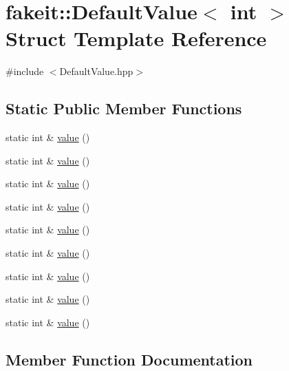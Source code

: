 \hypertarget{structfakeit_1_1DefaultValue_3_01int_01_4}{}\section{fakeit\+::Default\+Value$<$ int $>$ Struct Template Reference}
\label{structfakeit_1_1DefaultValue_3_01int_01_4}


{\ttfamily \#include $<$Default\+Value.\+hpp$>$}

\subsection*{Static Public Member Functions}
\begin{DoxyCompactItemize}
\item 
static int \& \mbox{\hyperlink{structfakeit_1_1DefaultValue_3_01int_01_4_a16688fb9ddd5fe0abef6efabc99daccb}{value}} ()
\item 
static int \& \mbox{\hyperlink{structfakeit_1_1DefaultValue_3_01int_01_4_a16688fb9ddd5fe0abef6efabc99daccb}{value}} ()
\item 
static int \& \mbox{\hyperlink{structfakeit_1_1DefaultValue_3_01int_01_4_a16688fb9ddd5fe0abef6efabc99daccb}{value}} ()
\item 
static int \& \mbox{\hyperlink{structfakeit_1_1DefaultValue_3_01int_01_4_a16688fb9ddd5fe0abef6efabc99daccb}{value}} ()
\item 
static int \& \mbox{\hyperlink{structfakeit_1_1DefaultValue_3_01int_01_4_a16688fb9ddd5fe0abef6efabc99daccb}{value}} ()
\item 
static int \& \mbox{\hyperlink{structfakeit_1_1DefaultValue_3_01int_01_4_a16688fb9ddd5fe0abef6efabc99daccb}{value}} ()
\item 
static int \& \mbox{\hyperlink{structfakeit_1_1DefaultValue_3_01int_01_4_a16688fb9ddd5fe0abef6efabc99daccb}{value}} ()
\item 
static int \& \mbox{\hyperlink{structfakeit_1_1DefaultValue_3_01int_01_4_a16688fb9ddd5fe0abef6efabc99daccb}{value}} ()
\item 
static int \& \mbox{\hyperlink{structfakeit_1_1DefaultValue_3_01int_01_4_a16688fb9ddd5fe0abef6efabc99daccb}{value}} ()
\end{DoxyCompactItemize}


\subsection{Member Function Documentation}
\mbox{\label{structfakeit_1_1DefaultValue_3_01int_01_4_a16688fb9ddd5fe0abef6efabc99daccb}} 
